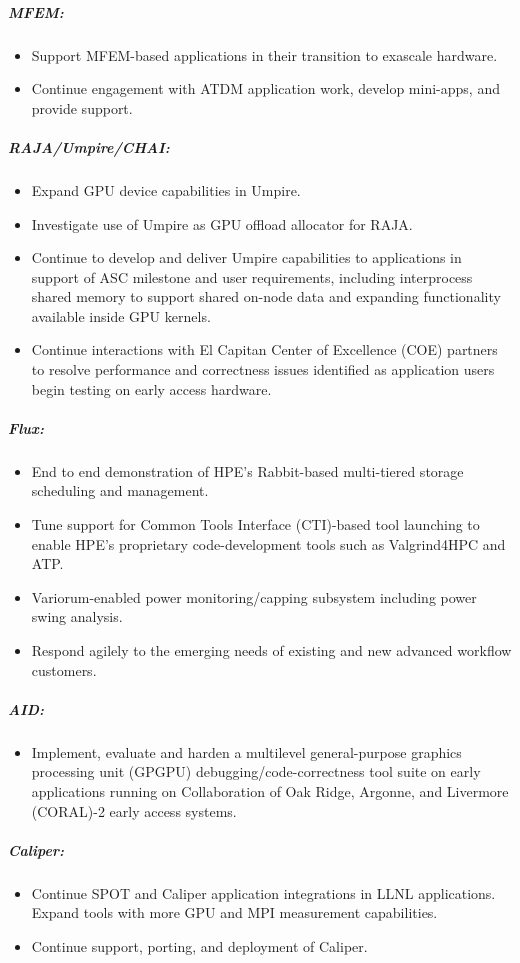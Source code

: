 \subparagraph{MFEM:}
\begin{itemize}
\item Support MFEM-based applications in their transition to exascale hardware.
\item Continue engagement with ATDM application work, develop mini-apps, and provide support.
\end{itemize}

\subparagraph{RAJA/Umpire/CHAI:}


\begin{itemize}
\item Expand GPU device capabilities in Umpire.
\item Investigate use of Umpire as GPU offload allocator for RAJA.
\item Continue to develop and deliver Umpire capabilities to applications in support of ASC milestone and user requirements, including interprocess shared memory to support shared on-node data and expanding functionality available inside GPU kernels.
\item Continue interactions with El Capitan Center of Excellence (COE) partners to resolve performance and correctness issues identified as application users begin testing on early access hardware.

\end{itemize}

\subparagraph{Flux:}

\begin{itemize}
\item End to end demonstration of HPE's Rabbit-based multi-tiered storage scheduling and management.
\item Tune support for Common Tools Interface (CTI)-based tool launching to enable HPE's proprietary code-development tools such as Valgrind4HPC and ATP.
\item Variorum-enabled power monitoring/capping subsystem including power swing analysis.
\item Respond agilely to the emerging needs of existing and new advanced workflow customers.
\end{itemize}

\subparagraph{AID:}
\begin{itemize}
\item Implement, evaluate and harden a multilevel general-purpose graphics processing unit (GPGPU) debugging/code-correctness tool suite on early applications running on Collaboration of Oak Ridge, Argonne, and Livermore (CORAL)-2 early access systems.
\end{itemize}

\subparagraph{Caliper:}
\begin{itemize}
\item Continue SPOT and Caliper application integrations in LLNL applications. Expand tools with more GPU and MPI measurement capabilities.
\item Continue support, porting, and deployment of Caliper.
\end{itemize}
